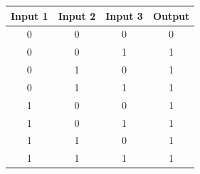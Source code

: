 \begin{figure}[H]
  \begin{subfigure}[t]{.49\columnwidth}
    \begin{tabular}[b]{cccc}
      \hline
    \multicolumn{1}{l}{\textbf{Input 1}} & \multicolumn{1}{l}{\textbf{Input 2}} & \multicolumn{1}{l}{\textbf{Input 3}} & \multicolumn{1}{l}{\textbf{Output}} \\
    \hline
    0 & 0                                    & 0                                    & 0                                   \\
    0 & 0                                    & 1                                    & 1                                   \\
    0 & 1                                    & 0                                    & 1                                   \\
    0 & 1                                    & 1                                    & 1                                   \\
    1 & 0                                    & 0                                    & 1                                   \\
    1 & 0                                    & 1                                    & 1                                   \\
    1 & 1                                    & 0                                    & 1                                   \\
    1 & 1                                    & 1                                    & 1                                   \\


\end{tabular}
\end{subfigure}
\end{figure}
